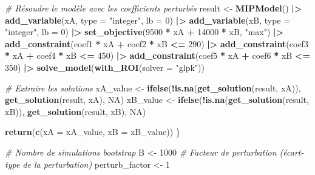 \documentclass[
]{article}
\newenvironment{Shaded}{\begin{snugshade}}{\end{snugshade}}
\newcommand{\AttributeTok}[1]{\textcolor[rgb]{0.13,0.29,0.53}{#1}}
\newcommand{\CommentTok}[1]{\textcolor[rgb]{0.56,0.35,0.01}{\textit{#1}}}
\newcommand{\ConstantTok}[1]{\textcolor[rgb]{0.56,0.35,0.01}{#1}}
\newcommand{\DecValTok}[1]{\textcolor[rgb]{0.00,0.00,0.81}{#1}}
\newcommand{\FunctionTok}[1]{\textcolor[rgb]{0.13,0.29,0.53}{\textbf{#1}}}
\newcommand{\NormalTok}[1]{#1}
\newcommand{\OtherTok}[1]{\textcolor[rgb]{0.56,0.35,0.01}{#1}}
\newcommand{\SpecialCharTok}[1]{\textcolor[rgb]{0.81,0.36,0.00}{\textbf{#1}}}
\newcommand{\StringTok}[1]{\textcolor[rgb]{0.31,0.60,0.02}{#1}}
\begin{document}
\begin{Shaded}
\begin{Highlighting}[]
  \CommentTok{\# Résoudre le modèle avec les coefficients perturbés}
\NormalTok{  result }\OtherTok{\textless{}{-}} \FunctionTok{MIPModel}\NormalTok{() }\SpecialCharTok{|\textgreater{}}
    \FunctionTok{add\_variable}\NormalTok{(xA, }\AttributeTok{type =} \StringTok{"integer"}\NormalTok{, }\AttributeTok{lb =} \DecValTok{0}\NormalTok{) }\SpecialCharTok{|\textgreater{}}
    \FunctionTok{add\_variable}\NormalTok{(xB, }\AttributeTok{type =} \StringTok{"integer"}\NormalTok{, }\AttributeTok{lb =} \DecValTok{0}\NormalTok{) }\SpecialCharTok{|\textgreater{}}
    \FunctionTok{set\_objective}\NormalTok{(}\DecValTok{9500} \SpecialCharTok{*}\NormalTok{ xA }\SpecialCharTok{+} \DecValTok{14000} \SpecialCharTok{*}\NormalTok{ xB, }\StringTok{"max"}\NormalTok{) }\SpecialCharTok{|\textgreater{}}
    \FunctionTok{add\_constraint}\NormalTok{(coef1 }\SpecialCharTok{*}\NormalTok{ xA }\SpecialCharTok{+}\NormalTok{ coef2 }\SpecialCharTok{*}\NormalTok{ xB }\SpecialCharTok{\textless{}=} \DecValTok{290}\NormalTok{) }\SpecialCharTok{|\textgreater{}}
    \FunctionTok{add\_constraint}\NormalTok{(coef3 }\SpecialCharTok{*}\NormalTok{ xA }\SpecialCharTok{+}\NormalTok{ coef4 }\SpecialCharTok{*}\NormalTok{ xB }\SpecialCharTok{\textless{}=} \DecValTok{450}\NormalTok{) }\SpecialCharTok{|\textgreater{}}
    \FunctionTok{add\_constraint}\NormalTok{(coef5 }\SpecialCharTok{*}\NormalTok{ xA }\SpecialCharTok{+}\NormalTok{ coef6 }\SpecialCharTok{*}\NormalTok{ xB }\SpecialCharTok{\textless{}=} \DecValTok{350}\NormalTok{) }\SpecialCharTok{|\textgreater{}}
    \FunctionTok{solve\_model}\NormalTok{(}\FunctionTok{with\_ROI}\NormalTok{(}\AttributeTok{solver =} \StringTok{"glpk"}\NormalTok{))}

  \CommentTok{\# Extraire les solutions}
\NormalTok{  xA\_value }\OtherTok{\textless{}{-}} \FunctionTok{ifelse}\NormalTok{(}\SpecialCharTok{!}\FunctionTok{is.na}\NormalTok{(}\FunctionTok{get\_solution}\NormalTok{(result, xA)), }\FunctionTok{get\_solution}\NormalTok{(result, xA), }\ConstantTok{NA}\NormalTok{)}
\NormalTok{  xB\_value }\OtherTok{\textless{}{-}} \FunctionTok{ifelse}\NormalTok{(}\SpecialCharTok{!}\FunctionTok{is.na}\NormalTok{(}\FunctionTok{get\_solution}\NormalTok{(result, xB)), }\FunctionTok{get\_solution}\NormalTok{(result, xB), }\ConstantTok{NA}\NormalTok{)}
  
  \FunctionTok{return}\NormalTok{(}\FunctionTok{c}\NormalTok{(}\AttributeTok{xA =}\NormalTok{ xA\_value, }\AttributeTok{xB =}\NormalTok{ xB\_value))}
\NormalTok{\}}

\CommentTok{\# Nombre de simulations bootstrap}
\NormalTok{B }\OtherTok{\textless{}{-}} \DecValTok{1000}
\CommentTok{\# Facteur de perturbation (écart{-}type de la perturbation)}
\NormalTok{perturb\_factor }\OtherTok{\textless{}{-}} \DecValTok{1}


\end{Highlighting}
\end{Shaded}
\end{document}

